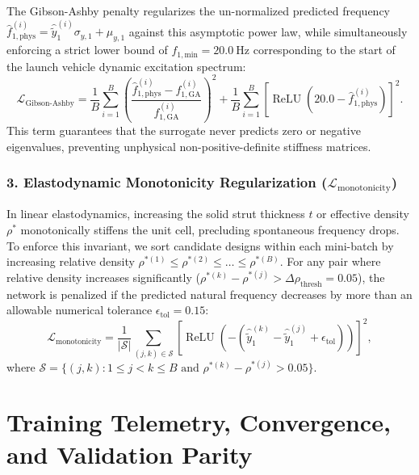 The Gibson-Ashby penalty regularizes the un-normalized predicted frequency $\hat{f}_{1,\text{phys}}^{(i)} = \hat{\tilde{y}}_1^{(i)} \sigma_{y,1} + \mu_{y,1}$ against this asymptotic power law, while simultaneously enforcing a strict lower bound of $f_{1,\text{min}} = \SI{20.0}{\hertz}$ corresponding to the start of the launch vehicle dynamic excitation spectrum:
\begin{equation}
\mathcal{L}_{\text{Gibson-Ashby}} = \frac{1}{B} \sum_{i=1}^B \left( \frac{\hat{f}_{1,\text{phys}}^{(i)} - f_{1,\text{GA}}^{(i)}}{f_{1,\text{GA}}^{(i)}} \right)^2 + \frac{1}{B} \sum_{i=1}^B \left[ \operatorname{ReLU}\left( 20.0 - \hat{f}_{1,\text{phys}}^{(i)} \right) \right]^2.
\label{eq:loss_ga}
\end{equation}
This term guarantees that the surrogate never predicts zero or negative eigenvalues, preventing unphysical non-positive-definite stiffness matrices.

\subsubsection{3. Elastodynamic Monotonicity Regularization ($\mathcal{L}_{\text{monotonicity}}$)}
In linear elastodynamics, increasing the solid strut thickness $t$ or effective density $\rho^*$ monotonically stiffens the unit cell, precluding spontaneous frequency drops. To enforce this invariant, we sort candidate designs within each mini-batch by increasing relative density $\rho^{*(1)} \le \rho^{*(2)} \le \dots \le \rho^{*(B)}$. For any pair where relative density increases significantly ($\rho^{*(k)} - \rho^{*(j)} > \Delta\rho_{\text{thresh}} = 0.05$), the network is penalized if the predicted natural frequency decreases by more than an allowable numerical tolerance $\epsilon_{\text{tol}} = 0.15$:
\begin{equation}
\mathcal{L}_{\text{monotonicity}} = \frac{1}{|\mathcal{S}|} \sum_{(j, k) \in \mathcal{S}} \left[ \operatorname{ReLU}\left( -\left(\hat{\tilde{y}}_1^{(k)} - \hat{\tilde{y}}_1^{(j)} + \epsilon_{\text{tol}}\right) \right) \right]^2,
\label{eq:loss_mono}
\end{equation}
where $\mathcal{S} = \{(j, k) : 1 \le j < k \le B \text{ and } \rho^{*(k)} - \rho^{*(j)} > 0.05\}$.

\section{Training Telemetry, Convergence, and Validation Parity}
\label{sec:training_telemetry}

